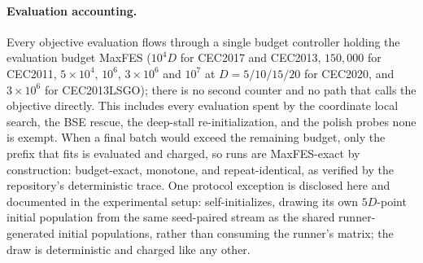 \paragraph{Evaluation accounting.}
Every objective evaluation flows through a single
budget controller holding the evaluation budget MaxFES ($10^{4}D$ for
CEC2017 and CEC2013, $150{,}000$ for CEC2011, $5\times10^{4}$,
$10^{6}$, $3\times10^{6}$ and $10^{7}$ at $D = 5/10/15/20$ for CEC2020,
and $3\times10^{6}$ for CEC2013LSGO); there is
no second counter and no path that calls the objective
directly. %
This includes every evaluation spent by the coordinate local search, the
BSE rescue, the deep-stall re-initialization, and the polish probes
none is exempt.
When a final batch would exceed the remaining budget, only the prefix
that fits is evaluated and charged, so runs are MaxFES-exact by
construction: budget-exact, monotone, and repeat-identical, as
verified by the repository's deterministic
trace. %
One protocol exception is disclosed here and documented in the
experimental setup: \dtgsk{} self-initializes, drawing its own
$5D$-point initial population from the same seed-paired stream as the
shared runner-generated initial populations, rather than consuming the
runner's matrix; the draw is deterministic and charged like any
other. %
